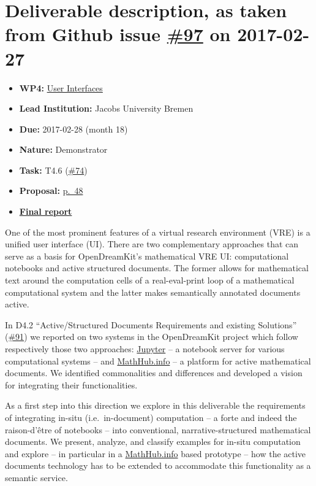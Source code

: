 \section*{\texorpdfstring{Deliverable description, as taken from Github
issue
\href{https://github.com/OpenDreamKit/OpenDreamKit/issues/97}{\#97} on
2017-02-27}{Deliverable description, as taken from Github issue \#97 on 2017-02-27}}\label{deliverable-description-as-taken-from-github-issue-97-on-2017-02-27}

\begin{itemize}
\tightlist
\item
  \textbf{WP4:}
  \href{https://github.com/OpenDreamKit/OpenDreamKit/tree/master/WP4}{User
  Interfaces}
\item
  \textbf{Lead Institution:} Jacobs University Bremen
\item
  \textbf{Due:} 2017-02-28 (month 18)
\item
  \textbf{Nature:} Demonstrator
\item
  \textbf{Task:} T4.6
  (\href{https://github.com/OpenDreamKit/OpenDreamKit/issues/74}{\#74})
\item
  \textbf{Proposal:}
  \href{https://github.com/OpenDreamKit/OpenDreamKit/raw/master/Proposal/proposal-www.pdf}{p.~48}
\item
  \textbf{\href{https://github.com/OpenDreamKit/OpenDreamKit/raw/master/WP4/D4.9/report-final.pdf}{Final
  report}}
\end{itemize}

One of the most prominent features of a virtual research environment
(VRE) is a unified user interface (UI). There are two complementary
approaches that can serve as a basis for OpenDreamKit's mathematical VRE
UI: computational notebooks and active structured documents. The former
allows for mathematical text around the computation cells of a
real-eval-print loop of a mathematical computational system and the
latter makes semantically annotated documents active.

In D4.2 ``Active/Structured Documents Requirements and existing
Solutions''
(\href{https://github.com/OpenDreamKit/OpenDreamKit/issues/91}{\#91}) we
reported on two systems in the OpenDreamKit project which follow
respectively those two approaches: \href{http://jupyter.org}{Jupyter} --
a notebook server for various computational systems -- and
\href{http://MathHub.info}{MathHub.info} -- a platform for active
mathematical documents. We identified commonalities and differences and
developed a vision for integrating their functionalities.

As a first step into this direction we explore in this deliverable the
requirements of integrating in-situ (i.e.~in-document) computation -- a
forte and indeed the raison-d'être of notebooks -- into conventional,
narrative-structured mathematical documents. We present, analyze, and
classify examples for in-situ computation and explore -- in particular
in a \href{http://MathHub.info}{MathHub.info} based prototype -- how the
active documents technology has to be extended to accommodate this
functionality as a semantic service.
